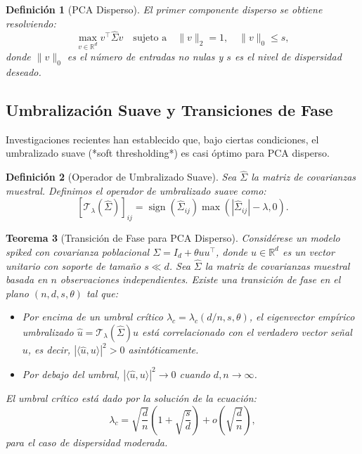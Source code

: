 \documentclass[11pt]{article}
\theoremstyle{plain}
\newtheorem{theorem}{Teorema}[section]
\newtheorem{definition}[theorem]{Definición}
\begin{document}
\begin{definition}[PCA Disperso]
El primer componente disperso se obtiene resolviendo:
\[
\max_{v \in \mathbb{R}^d} v^\top \hat{\Sigma} v \quad \text{sujeto a} \quad \|v\|_2 = 1, \quad \|v\|_0 \leq s,
\]
donde $\|v\|_0$ es el número de entradas no nulas y $s$ es el nivel de dispersidad deseado.
\end{definition}

\subsection{Umbralización Suave y Transiciones de Fase}

Investigaciones recientes han establecido que, bajo ciertas condiciones, el umbralizado suave (*soft thresholding*) es casi óptimo para PCA disperso.

\begin{definition}[Operador de Umbralizado Suave]
Sea $\hat{\Sigma}$ la matriz de covarianzas muestral. Definimos el operador de umbralizado suave como:
\[
[\mathcal{T}_\lambda(\hat{\Sigma})]_{ij} = \operatorname{sign}(\hat{\Sigma}_{ij}) \max(|\hat{\Sigma}_{ij}| - \lambda, 0).
\]
\end{definition}

\begin{theorem}[Transición de Fase para PCA Disperso]
\label{thm:phase_transition}
Considérese un modelo spiked con covarianza poblacional $\Sigma = I_d + \theta u u^\top$, donde $u \in \mathbb{R}^d$ es un vector unitario con soporte de tamaño $s \ll d$. Sea $\hat{\Sigma}$ la matriz de covarianzas muestral basada en $n$ observaciones independientes. Existe una transición de fase en el plano $(n, d, s, \theta)$ tal que:

\begin{itemize}
    \item Por encima de un umbral crítico $\lambda_c = \lambda_c(d/n, s, \theta)$, el eigenvector empírico umbralizado $\hat{u} = \mathcal{T}_\lambda(\hat{\Sigma}) u$ está correlacionado con el verdadero vector señal $u$, es decir, $|\langle \hat{u}, u \rangle|^2 > 0$ asintóticamente.
    \item Por debajo del umbral, $|\langle \hat{u}, u \rangle|^2 \to 0$ cuando $d, n \to \infty$.
\end{itemize}

El umbral crítico está dado por la solución de la ecuación:
\[
\lambda_c = \sqrt{\frac{d}{n}} \left(1 + \sqrt{\frac{s}{d}}\right) + o\left(\sqrt{\frac{d}{n}}\right),
\]
para el caso de dispersidad moderada.
\end{theorem}
\end{document}
